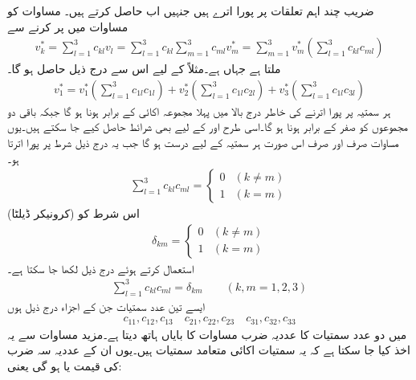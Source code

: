  ضریب   چند اہم تعلقات پر پورا اترے ہیں جنہیں اب حاصل کرتے ہیں۔ مساوات  کو مساوات  میں پر کرنے سے
\begin{align}\label{مساوات_الاحصاء_تبادل_نظام_ٹ}
v_k^*=\sum_{l=1}^3 c_{kl}v_l=\sum_{l=1}^3 c_{kl}\sum_{m=1}^3 c_{ml} v_m^*=\sum_{m=1}^3 v_m^* \left(\sum_{l=1}^3 c_{kl}c_{ml}\right)
\end{align}
ملتا ہے جہاں  ہے۔مثلاً  کے لیے اس سے درج ذیل حاصل ہو گا۔
\begin{align*}
v_1^*= v_1^*\left(\sum_{l=1}^3 c_{1l}c_{1l}\right)+v_2^*\left(\sum_{l=1}^3 c_{1l}c_{2l}\right)+v_3^*\left(\sum_{l=1}^3 c_{1l}c_{3l}\right)
\end{align*}
ہر سمتیہ  پر پورا اترنے کی خاطر درج بالا میں پہلا مجموعہ اکائی کے برابر ہونا ہو گا جبکہ باقی دو مجموعوں کو صفر کے برابر ہونا ہو گا۔اسی طرح  اور  کے لیے بھی شرائط حاصل کیے جا سکتے ہیں۔یوں  مساوات  صرف اور صرف اس صورت ہر سمتیہ کے لیے درست ہو گا جب یہ درج ذیل شرط پر پورا اترتا ہو۔
\begin{align}\label{مساوات_الاحصاء_عددی_سر_شرط_الف}
\sum_{l=1}^3 c_{kl}c_{ml}=
\begin{cases}
0 & (k \ne m)\\
1& (k=m)
\end{cases}
\end{align}
اس شرط کو  (کرونیکر ڈیلٹا) 
\begin{align*}
\delta_{km}=
\begin{cases}
0&(k\ne m)\\
1&(k=m)
\end{cases}
\end{align*}
استعمال کرتے ہوئے درج ذیل لکھا جا سکتا ہے۔
\begin{align}\label{مساوات_الاحصاء_کرونیکر_الف}
\sum_{l=1}^3 c_{kl}c_{ml}=\delta_{km}\quad \quad (k,m=1,2,3)
\end{align}
ایسے تین عدد سمتیات جن کے اجزاء درج ذیل ہوں
\begin{align*}
c_{11}, c_{12}, c_{13}\quad c_{21}, c_{22}, c_{23} \quad c_{31}, c_{32}, c_{33}
\end{align*}
میں دو عدد سمتیات کا عددیہ ضرب مساوات  کا بایاں ہاتھ دیتا ہے۔مزید مساوات  سے یہ اخذ کیا جا سکتا ہے کہ یہ سمتیات اکائی متعامد سمتیات    ہیں۔یوں ان کے عددیہ سہ ضرب کی قیمت  یا  ہو گی یعنی:
